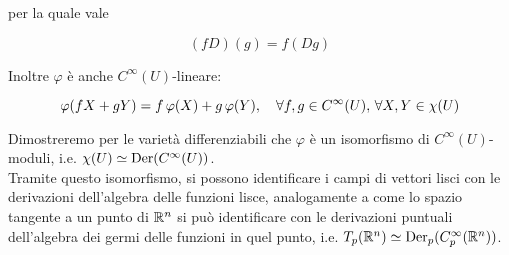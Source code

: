 per la quale vale

\begin{equation}
	(f D) (g) = f (D g)
\end{equation}

Inoltre $ \varphi $ è anche $ C^{\infty}(U) $-lineare:

\begin{equation}
	\varphi(f X + g Y) = f \, \varphi(X) + g \, \varphi(Y) \qcomma \forall f, g \in C^{\infty}(U), \, \forall X, Y \in \chi(U)
\end{equation}

Dimostreremo per le varietà differenziabili che $ \varphi $ è un isomorfismo di $ C^{\infty}(U) $-moduli, i.e. $ \chi(U) \simeq \operatorname{Der}(C^{\infty}(U)) $. \\
Tramite questo isomorfismo, si possono identificare i campi di vettori lisci con le derivazioni dell'algebra delle funzioni lisce, analogamente a come lo spazio tangente a un punto di $ \mathbb{R}^{n} $ si può identificare con le derivazioni puntuali dell'algebra dei germi delle funzioni in quel punto, i.e. $ T_{p}(\mathbb{R}^{n}) \simeq \operatorname{Der}_{p}(C_{p}^{\infty}(\mathbb{R}^{n})) $.
